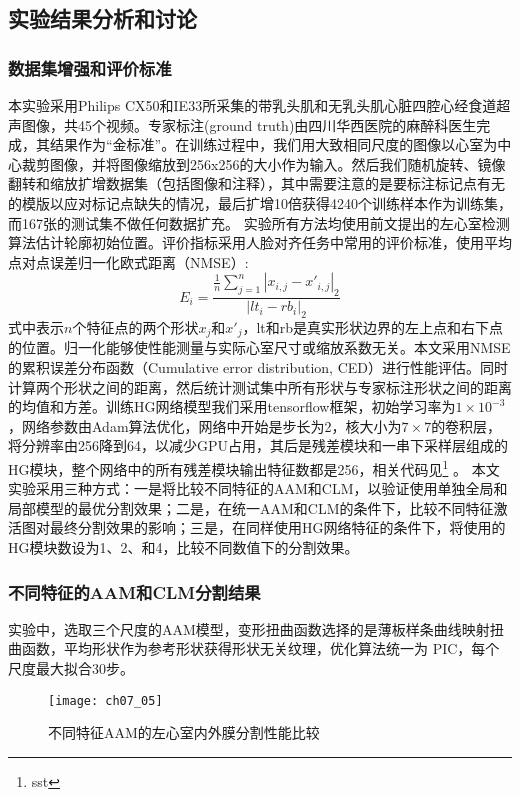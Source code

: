 \subsection{实验结果分析和讨论}
\subsubsection{数据集增强和评价标准}

本实验采用Philips CX50和IE33所采集的带乳头肌和无乳头肌心脏四腔心经食道超声图像，共45个视频。专家标注(ground truth)由四川华西医院的麻醉科医生完成，其结果作为“金标准”。在训练过程中，我们用大致相同尺度的图像以心室为中心裁剪图像，并将图像缩放到256x256的大小作为输入。然后我们随机旋转、镜像翻转和缩放扩增数据集（包括图像和注释），其中需要注意的是要标注标记点有无的模版以应对标记点缺失的情况，最后扩增10倍获得4240个训练样本作为训练集，而167张的测试集不做任何数据扩充。
实验所有方法均使用前文提出的左心室检测算法估计轮廓初始位置。评价指标采用人脸对齐任务中常用的评价标准，使用平均点对点误差归一化欧式距离（NMSE）:
\begin{equation}\label{eq:ch07_15}
    E_i=\frac{\frac{1}{n}\sum_{j=1}^n|x_{i,j}-x'_{i,j}|_2}{|lt_i-rb_i|_2}
\end{equation}
式中表示$n$个特征点的两个形状$x_j $和$x'_j$，lt和rb是真实形状边界的左上点和右下点的位置。归一化能够使性能测量与实际心室尺寸或缩放系数无关。本文采用NMSE的累积误差分布函数（Cumulative error distribution, CED）进行性能评估。同时计算两个形状之间的距离，然后统计测试集中所有形状与专家标注形状之间的距离的均值和方差。训练HG网络模型我们采用tensorflow框架，初始学习率为$1\times 10^{-3}$，网络参数由Adam算法\citep{Kingma2014}优化，网络中开始是步长为2，核大小为$7\times 7$的卷积层，将分辨率由256降到64，以减少GPU占用，其后是残差模块和一串下采样层组成的HG模块，整个网络中的所有残差模块输出特征数都是256，相关代码见\footnote{sst} 。
本文实验采用三种方式：一是将比较不同特征的AAM和CLM，以验证使用单独全局和局部模型的最优分割效果；二是，在统一AAM和CLM的条件下，比较不同特征激活图对最终分割效果的影响；三是，在同样使用HG网络特征的条件下，将使用的HG模块数设为1、2、和4，比较不同数值下的分割效果。

\subsubsection{不同特征的AAM和CLM分割结果}
实验中，选取三个尺度的AAM模型，变形扭曲函数选择的是薄板样条曲线映射扭曲函数，平均形状作为参考形状获得形状无关纹理，优化算法统一为 PIC，每个尺度最大拟合30步。
\begin{figure}[!htbp]
\centering
\texttt{[image: ch07\_05]}
\caption{不同特征AAM的左心室内外膜分割性能比较}
\label{fig:ch07_05}
\end{figure}  

